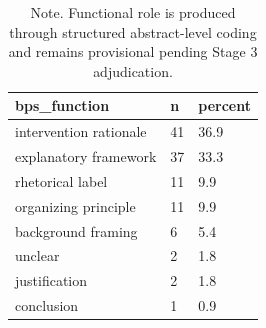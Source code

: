 \begin{table}[htbp]
\raggedright
\caption{Primary Research Question 1. BPS functional role.}
\label{tab.bps.function}
\begin{tabular}{lll}
\toprule
bps\_function & n & percent \\
\midrule
intervention rationale & 41 & 36.9 \\
explanatory framework & 37 & 33.3 \\
rhetorical label & 11 & 9.9 \\
organizing principle & 11 & 9.9 \\
background framing & 6 & 5.4 \\
unclear & 2 & 1.8 \\
justification & 2 & 1.8 \\
conclusion & 1 & 0.9 \\
\bottomrule
\end{tabular}

\caption*{Note. Functional role is produced through structured abstract-level coding and remains provisional pending Stage 3 adjudication.}
\end{table}
